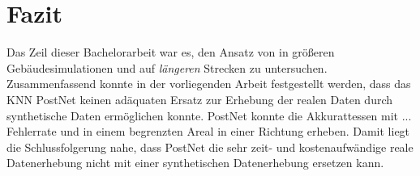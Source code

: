 
\section{Fazit}
\label{sec:kapitel_6}
Das Zeil dieser Bachelorarbeit war es, den Ansatz von \citet{acharyaBIMPoseNetIndoorCamera2019} in größeren Gebäudesimulationen und auf \textit{längeren} Strecken zu untersuchen.
Zusammenfassend konnte in der vorliegenden Arbeit festgestellt werden, dass das KNN PostNet keinen adäquaten Ersatz zur Erhebung der realen Daten durch synthetische Daten ermöglichen konnte. PostNet konnte die Akkurattessen mit ... Fehlerrate und in einem begrenzten Areal in einer Richtung erheben. Damit liegt die Schlussfolgerung nahe, dass PostNet die sehr zeit- und kostenaufwändige reale Datenerhebung nicht mit einer synthetischen Datenerhebung ersetzen kann.
